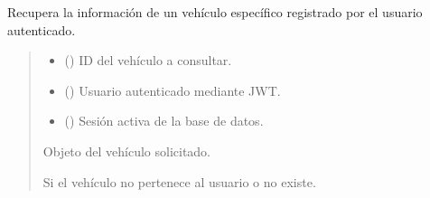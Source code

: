 \documentclass[letterpaper,10pt,spanish]{sphinxmanual}
\begin{document}
\begin{fulllineitems}
\label{\detokenize{endpoints:main.obtener_vehiculo}}
\pysigstartsignatures
\pysiglinewithargsret
{}
{\sphinxparamcomma {}\sphinxparamcomma {}}
{}
\pysigstopsignatures
\sphinxAtStartPar
Recupera la información de un vehículo específico registrado por el usuario autenticado.
\begin{quote}\begin{description}
\begin{itemize}
\item {} 
\sphinxAtStartPar
{} () \textendash{} ID del vehículo a consultar.

\item {} 
\sphinxAtStartPar
{} ({\hyperref[\detokenize{modelos:main.Usuario}]{}}) \textendash{} Usuario autenticado mediante JWT.

\item {} 
\sphinxAtStartPar
{} () \textendash{} Sesión activa de la base de datos.

\end{itemize}

\sphinxAtStartPar
Objeto del vehículo solicitado.

\sphinxAtStartPar
{\hyperref[\detokenize{modelos:main.Vehiculo}]{}}

\sphinxAtStartPar
{} \textendash{} Si el vehículo no pertenece al usuario o no existe.

\end{description}\end{quote}

\end{fulllineitems}
\end{document}
